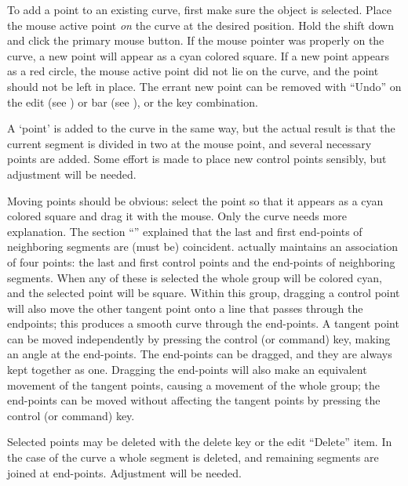 		To add a point to an existing curve, first make sure
		the object is selected. Place the mouse active point
		\emph{on} the curve at the desired position.
		Hold the shift  down and click the
		primary mouse button. If the mouse pointer was
		properly on the curve, a new point will appear as a
		cyan colored square. If a new point appears as
		a red circle, the mouse active point did not lie on the
		curve, and the point should not be left in place.
		The errant new point can be removed with
		``Undo'' on the edit 
		(see ) or  bar
		(see ),
		or the  key combination.
		
		A `point' is added to the \IXbezn{} curve in the
		same way, but the actual result is that the current
		segment is divided in two at the mouse point, and
		several necessary points are added. Some effort is
		made to place new  control
		points sensibly, but adjustment will be needed.
		
		Moving points should be obvious: select the point so
		that it appears as a cyan colored square and drag it
		with the mouse. Only the \IXbezn{} curve needs more
		explanation. The section
		``'' explained
		that the last and first end-points of neighboring
		segments are (must be) coincident. \IXpkgu{}
		actually maintains an association of four points:
		the last and first  control points
		and the end-points of neighboring segments. When any
		of these is selected the whole group will be
		colored cyan, and the selected point will be square.
		Within this group, dragging a 
		control point will also move the other tangent
		point onto a line that passes through the endpoints;
		this produces a smooth curve through the end-points.
		A tangent point can be moved independently by
		pressing the control (or command) key, making
		an angle at the end-points. The end-points can
		be dragged, and they are always kept together
		as one. Dragging the end-points will also make
		an equivalent movement of the
		tangent points, causing a movement of the
		whole group; the end-points can be moved
		without affecting the tangent points by
		pressing the control (or command) key.
		
		Selected points may be deleted with the delete key
		or the edit  ``Delete'' item.
		In the case of the
		\IXbezn{} curve a whole segment is
		deleted, and remaining segments are joined at
		end-points. Adjustment will be needed.

